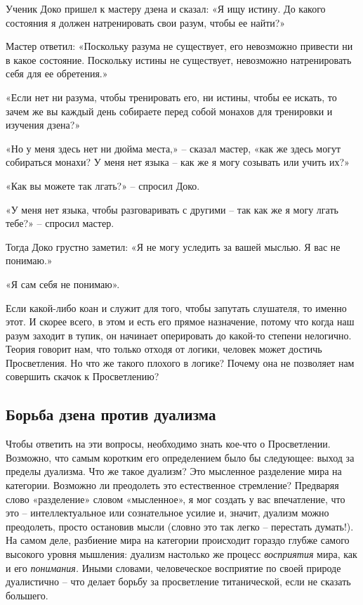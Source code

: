 \documentclass[../main.tex]{subfiles}
\begin{document}
\begin{koan}
    Ученик Доко пришел к мастеру дзена и сказал: «Я ищу истину. До какого состояния я должен натренировать свои разум, чтобы ее найти?»

    Мастер ответил: «Поскольку разума не существует, его невозможно привести ни в какое состояние. Поскольку истины не существует, невозможно натренировать себя для ее обретения.»

    «Если нет ни разума, чтобы тренировать его, ни истины, чтобы ее искать, то зачем же вы каждый день собираете перед собой монахов для тренировки и изучения дзена?»

    «Но у меня здесь нет ни дюйма места,» \--- сказал мастер, «как же здесь могут собираться монахи? У меня нет языка \--- как же я могу созывать или учить их?»

    «Как вы можете так лгать?» \--- спросил Доко.

    «У меня нет языка, чтобы разговаривать с другими \--- так как же я могу лгать тебе?» \--- спросил мастер.

    Тогда Доко грустно заметил: «Я не могу уследить за вашей мыслью. Я вас не понимаю.»

    «Я сам себя не понимаю».
\end{koan}

Если какой-либо коан и служит для того, чтобы запутать слушателя, то именно этот. И скорее всего, в этом и есть его прямое назначение, потому что когда наш разум заходит в тупик, он начинает оперировать до какой-то степени нелогично. Теория говорит нам, что только отходя от логики, человек может достичь Просветления. Но что же такого плохого в логике? Почему она не позволяет нам совершить скачок к Просветлению?


\subsection{Борьба дзена против дуализма}

Чтобы ответить на эти вопросы, необходимо знать кое-что о Просветлении. Возможно, что самым коротким его определением было бы следующее: выход за пределы дуализма. Что же такое дуализм? Это мысленное разделение мира на категории. Возможно ли преодолеть это естественное стремление? Предваряя слово «разделение» словом «мысленное», я мог создать у вас впечатление, что это \--- интеллектуальное или сознательное усилие и, значит, дуализм можно преодолеть, просто остановив мысли (словно это так легко \--- перестать думать!). На самом деле, разбиение мира на категории происходит гораздо глубже самого высокого уровня мышления: дуализм настолько же процесс \emph{восприятия} мира, как и его \emph{понимания.} Иными словами, человеческое восприятие по своей природе дуалистично \--- что делает борьбу за просветление титанической, если не сказать большего.
\end{document}
